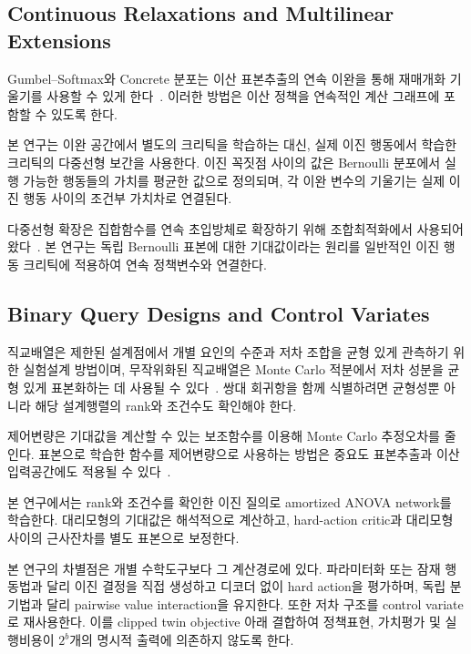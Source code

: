 \documentclass[10pt,journal]{IEEEtran}
\begin{document}
\subsection{Continuous Relaxations and Multilinear Extensions}

Gumbel--Softmax와 Concrete 분포는 이산 표본추출의 연속 이완을 통해 재매개화 기울기를 사용할 수 있게 한다~\cite{jang2017,maddison2017}. 이러한 방법은 이산 정책을 연속적인 계산 그래프에 포함할 수 있도록 한다.

본 연구는 이완 공간에서 별도의 크리틱을 학습하는 대신, 실제 이진 행동에서 학습한 크리틱의 다중선형 보간을 사용한다. 이진 꼭짓점 사이의 값은 Bernoulli 분포에서 실행 가능한 행동들의 가치를 평균한 값으로 정의되며, 각 이완 변수의 기울기는 실제 이진 행동 사이의 조건부 가치차로 연결된다.

다중선형 확장은 집합함수를 연속 초입방체로 확장하기 위해 조합최적화에서 사용되어 왔다~\cite{calinescu2011}. 본 연구는 독립 Bernoulli 표본에 대한 기대값이라는 원리를 일반적인 이진 행동 크리틱에 적용하여 연속 정책변수와 연결한다.


\subsection{Binary Query Designs and Control Variates}

직교배열은 제한된 설계점에서 개별 요인의 수준과 저차 조합을 균형 있게 관측하기 위한 실험설계 방법이며, 무작위화된 직교배열은 Monte Carlo 적분에서 저차 성분을 균형 있게 표본화하는 데 사용될 수 있다~\cite{owen1992,owen1994}. 쌍대 회귀항을 함께 식별하려면 균형성뿐 아니라 해당 설계행렬의 rank와 조건수도 확인해야 한다.

제어변량은 기대값을 계산할 수 있는 보조함수를 이용해 Monte Carlo 추정오차를 줄인다. 표본으로 학습한 함수를 제어변량으로 사용하는 방법은 중요도 표본추출과 이산 입력공간에도 적용될 수 있다~\cite{tracey2016}.

본 연구에서는 rank와 조건수를 확인한 이진 질의로 amortized ANOVA network를 학습한다. 대리모형의 기대값은 해석적으로 계산하고, hard-action critic과 대리모형 사이의 근사잔차를 별도 표본으로 보정한다.

본 연구의 차별점은 개별 수학도구보다 그 계산경로에 있다. 파라미터화 또는 잠재 행동법과 달리 이진 결정을 직접 생성하고 디코더 없이 hard action을 평가하며, 독립 분기법과 달리 pairwise value interaction을 유지한다. 또한 저차 구조를 control variate로 재사용한다. 이를 clipped twin objective 아래 결합하여 정책표현, 가치평가 및 실행비용이 $2^b$개의 명시적 출력에 의존하지 않도록 한다.
\end{document}
